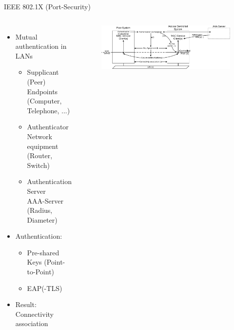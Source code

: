 \documentclass[fleqn,compress,utf8,aspectratio=169,t]{beamer}
\begin{document}
\iffalse
\begin{frame}{IEEE 802.1X (Port-Security)}
  \begin{columns}[T]
  \begin{itemize}
    \item Mutual authentication in LANs
    \begin{itemize}
      \item<2-> Supplicant (Peer)\\
      Endpoints (Computer, Telephone, ...)
      \item<3-> Authenticator\\
      Network equipment (Router, Switch)
      \item<4-> Authentication Server\\
      AAA-Server (Radius, Diameter)
    \end{itemize}
  \item<5-> Authentication:
  \begin{itemize}
    \item Pre-shared Keys (Point-to-Point)
    \item EAP(-TLS)
  \end{itemize}
  \item<6-> Result: Connectivity association
\end{itemize}
\begin{figure}[t]
  \centering\includegraphics[trim={0 0 0 0}, clip, width=1.0\columnwidth]{8021x_fig_6_1_overview.pdf}
\end{figure}
\end{columns}
\end{frame}
\end{document}

